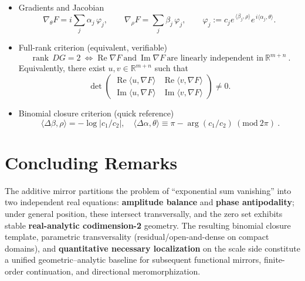 \documentclass[11pt,a4paper]{article}
\theoremstyle{remark}
\DeclareMathOperator{\Re}{Re}
\DeclareMathOperator{\Im}{Im}
\DeclareMathOperator{\rank}{rank}
\begin{document}
\begin{itemize}
\item Gradients and Jacobian
\begin{equation}
\nabla_{\theta}F=i\sum_j \alpha_j\,\varphi_j,\qquad
\nabla_{\rho}F=\sum_j \beta_j\,\varphi_j,\qquad
\varphi_j:=c_j e^{\,\langle\beta_j,\rho\rangle}e^{\,i\langle\alpha_j,\theta\rangle}.
\end{equation}

\item Full-rank criterion (equivalent, verifiable)
\begin{equation}
\boxed{\ \rank\,DG=2\ \Longleftrightarrow
\Re\nabla F\ \text{and}\ \Im\nabla F\ \text{are linearly independent in}\ \mathbb{R}^{m+n}\ }.
\end{equation}
Equivalently, there exist $u,v\in\mathbb{R}^{m+n}$ such that
\begin{equation}
\det\begin{pmatrix}
\Re\langle u,\nabla F\rangle & \Re\langle v,\nabla F\rangle\\[2pt]
\Im\langle u,\nabla F\rangle & \Im\langle v,\nabla F\rangle
\end{pmatrix}\neq 0.
\end{equation}

\item Binomial closure criterion (quick reference)
\begin{equation}
\boxed{\ \langle \Delta\beta,\rho\rangle=-\log|c_1/c_2|,\quad
\langle \Delta\alpha,\theta\rangle\equiv \pi-\arg(c_1/c_2)\ (\mathrm{mod}\ 2\pi)\ }.
\end{equation}
\end{itemize}

\section*{Concluding Remarks}

The additive mirror partitions the problem of ``exponential sum vanishing'' into two independent real equations: \textbf{amplitude balance} and \textbf{phase antipodality}; under general position, these intersect transversally, and the zero set exhibits stable \textbf{real-analytic codimension-2} geometry. The resulting binomial closure template, parametric transversality (residual/open-and-dense on compact domains), and \textbf{quantitative necessary localization} on the scale side constitute a unified geometric--analytic baseline for subsequent functional mirrors, finite-order continuation, and directional meromorphization.
\end{document}
